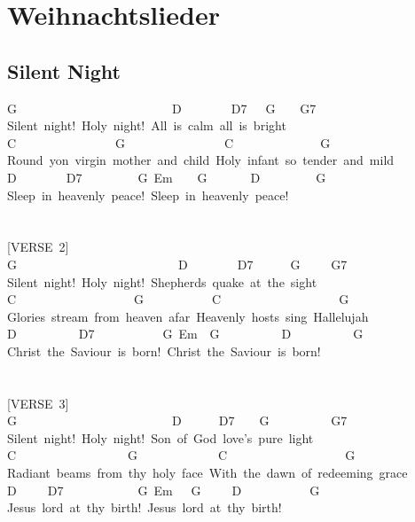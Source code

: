 \documentclass[]{book}
\let\stdsection\section
\renewcommand\section{\clearpage\stdsection}
\begin{document}
\hypertarget{weihnachtslieder}{%
\chapter{Weihnachtslieder}\label{weihnachtslieder}}

\hypertarget{silent-night}{%
\section{Silent Night}\label{silent-night}}

G~~~~~~~~~~~~~~~~~~~~~~~~~D~~~~~~~~D7~~~G~~~~G7~~~~~~\\
Silent~night!~Holy~night!~All~is~calm~all~is~bright~\\
C~~~~~~~~~~~~~~~~G~~~~~~~~~~~~~~~~C~~~~~~~~~~~~~~G\\
Round~yon~virgin~mother~and~child~Holy~infant~so~tender~and~mild~\\
D~~~~~~~~D7~~~~~~~~~G~Em~~~~G~~~~~~~D~~~~~~~~~G\\
Sleep~in~heavenly~peace!~Sleep~in~heavenly~peace!\\
~\\
~\\
{[}VERSE~2{]}\\
G~~~~~~~~~~~~~~~~~~~~~~~~~~D~~~~~~~~D7~~~~~~G~~~~~G7~~~~~\\
Silent~night!~Holy~night!~Shepherds~quake~at~the~sight\\
C~~~~~~~~~~~~~~~~~~~G~~~~~~~~~~~C~~~~~~~~~~~~~~~~~~~G\\
Glories~stream~from~heaven~afar~Heavenly~hosts~sing~Hallelujah\\
D~~~~~~~~~~D7~~~~~~~~~~~G~Em~~G~~~~~~~~~~D~~~~~~~~~~G\\
Christ~the~Saviour~is~born!~Christ~the~Saviour~is~born!\\
~\\
~\\
{[}VERSE~3{]}\\
G~~~~~~~~~~~~~~~~~~~~~~~~~D~~~~~~D7~~~~G~~~~~~~~~~G7\\
Silent~night!~Holy~night!~Son~of~God~love's~pure~light~\\
C~~~~~~~~~~~~~~~~~~G~~~~~~~~~~~~~C~~~~~~~~~~~~~~~~~~~G\\
Radiant~beams~from~thy~holy~face~With~the~dawn~of~redeeming~grace\\
D~~~~~D7~~~~~~~~~~~~G~Em~~~G~~~~~D~~~~~~~~~~~G\\
Jesus~lord~at~thy~birth!~Jesus~lord~at~thy~birth!~\\
~\\
\end{document}
